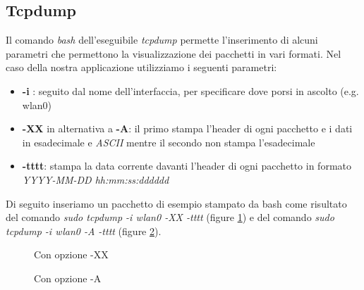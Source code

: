 \documentclass[12pt]{article} %
\begin{document}

\subsection{Tcpdump} %

Il comando \textit{bash} dell'eseguibile \textit{tcpdump} permette l'inserimento di alcuni parametri che permettono la visualizzazione dei pacchetti in vari formati. Nel caso della nostra applicazione utilizziamo i seguenti parametri:

\begin{itemize}
\item \textbf{-i} : seguito dal nome dell'interfaccia, per specificare dove porsi in ascolto (e.g. wlan0)
\item \textbf{-XX} in alternativa a \textbf{-A}: il primo stampa l'header di ogni pacchetto e i dati in esadecimale e \textit{ASCII} mentre il secondo non stampa l'esadecimale
\item \textbf{-tttt}: stampa la data corrente davanti l'header di ogni pacchetto in formato \textit{YYYY-MM-DD hh:mm:ss:dddddd}
\end{itemize}

Di seguito inseriamo un pacchetto di esempio stampato da bash come risultato del comando \textit{sudo tcpdump -i wlan0 -XX -tttt} (figure \ref{fig:XX}) e del comando \textit{sudo tcpdump -i wlan0 -A -tttt} (figure \ref{fig:A}).

\begin{figure}[H] %
\caption{Con opzione -XX}\label{fig:XX}
\end{figure}

\begin{figure}[H] %
\caption{Con opzione -A}\label{fig:A}
\end{figure}
\end{document}
